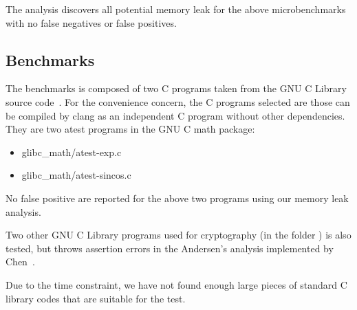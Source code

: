 The analysis discovers all potential memory leak for the above microbenchmarks 
with no false negatives or false positives.


\subsection{Benchmarks}
\label{benchmarks}

The benchmarks is composed of two C programs taken from the GNU C Library 
source code~\cite{glibc}. For the convenience concern, the C programs selected 
are those can be compiled by clang as an independent C program without other
dependencies. They are two atest programs in the GNU C math package:

\begin{itemize}
  \item glibc\_math/atest-exp.c
  \item glibc\_math/atest-sincos.c
\end{itemize}

No false positive are reported for the above two programs using our memory leak 
analysis.

Two other GNU C Library programs used for cryptography (in the folder \crypt) 
is also tested, but throws assertion errors in the Andersen's 
analysis implemented by Chen~\cite{chen}.

Due to the time constraint, we have not found enough large pieces of standard C 
library codes that are suitable for the test.
